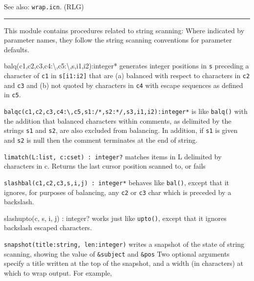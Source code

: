 See also: \texttt{wrap.icn}. (RLG)

\vspace{0.25cm}\hrule{}

This module contains procedures related to string
scanning: Where indicated by parameter names, they follow the string
scanning conventions for parameter defaults.

\textsf{balq(c1,c2,c3,c4:{\textquotesingle}{\textbackslash}{\textquotesingle}{\textquotedbl}{\textquotesingle},c5:{\textquotesingle}{\textbackslash}{\textquotesingle},s,i1,i2):integer*}
generates integer positions in \texttt{s} preceding a character of
\texttt{c1} in \texttt{s[i1:i2]} that are (a) balanced with respect to
characters in \texttt{c2} and \texttt{c3} and (b) not
{\textquotedbl}quoted{\textquotedbl} by characters in \texttt{c4} with
{\textquotedbl}escape{\textquotedbl} sequences as defined in
\texttt{c5}.

\texttt{balqc(c1,c2,c3,c4:{\textquotesingle}{\textbackslash}{\textquotesingle}{\textquotedbl}{\textquotesingle},c5,s1:{\textquotedbl}/*{\textquotedbl},s2:{\textquotedbl}*/{\textquotedbl},s3,i1,i2):integer*}
is like \texttt{balq()} with the addition that balanced characters
within {\textquotedbl}comments{\textquotedbl}, as delimited by the
strings \texttt{s1} and \texttt{s2}, are also excluded from balancing.
In addition, if \texttt{s1} is given and \texttt{s2} is null then the
comment terminates at the end of string.

\texttt{limatch(L:list, c:cset) : integer?} matches items in L delimited
by characters in c. Returns the last cursor position scanned to, or
fails 

\texttt{slashbal(c1,c2,c3,s,i,j) : integer*} behaves like
\texttt{bal()}, except that it ignores, for purposes of balancing, any
\texttt{c2} or \texttt{c3} char which is preceded by a backslash.

\textsf{slashupto(c, s, i, j) : integer?} works just like
\texttt{upto()}, except that it ignores backslash escaped characters.

\texttt{snapshot(title:string, len:integer)} writes a snapshot of the
state of string scanning, showing the value of \texttt{\&subject} and
\texttt{\&pos} Two optional arguments specify a title written at the
top of the snapshot, and a width (in characters) at which to wrap
output. For example,


